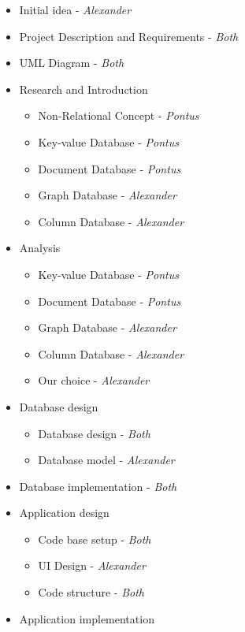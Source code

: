 \begin{itemize}
    \item Initial idea - \emph{Alexander}
    \item Project Description and Requirements - \emph{Both}
    \item UML Diagram - \emph{Both}
    \item Research and Introduction
        \begin{itemize}
            \item Non-Relational Concept - \emph{Pontus}
            \item Key-value Database - \emph{Pontus}
            \item Document Database - \emph{Pontus}
            \item Graph Database - \emph{Alexander}
            \item Column Database - \emph{Alexander}
        \end{itemize}
    \item Analysis
        \begin{itemize}
            \item Key-value Database - \emph{Pontus}
            \item Document Database - \emph{Pontus}
            \item Graph Database - \emph{Alexander}
            \item Column Database - \emph{Alexander}
            \item Our choice - \emph{Alexander}
        \end{itemize}
    \item Database design
        \begin{itemize}
            \item Database design - \emph{Both}
            \item Database model - \emph{Alexander}
        \end{itemize}
    \item Database implementation - \emph{Both}
    \item Application design
        \begin{itemize}
            \item Code base setup - \emph{Both}
            \item UI Design - \emph{Alexander}
            \item Code structure - \emph{Both}
        \end{itemize}
    \item Application implementation

\end{itemize}

